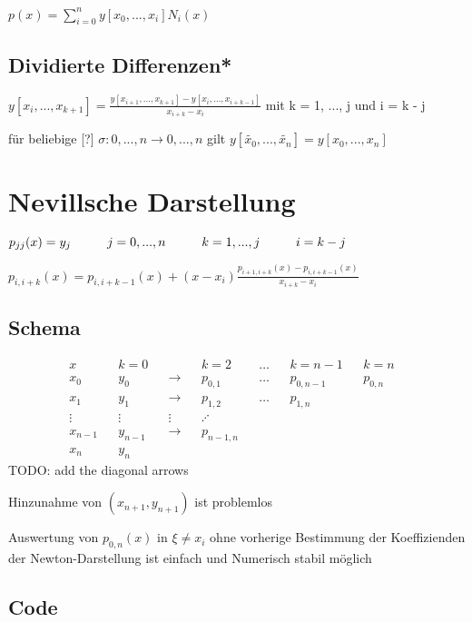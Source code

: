 \documentclass[12pt,a4paper]{article} %
\newcommand*\tab[1][1cm]{\hspace*{#1}}
\begin{document}
	$p(x) = \sum_{i = 0}^{n}y[x_0, ..., x_i] N_i(x)$
	
	\subsection{Dividierte Differenzen*}
	
	$y[x_i, ..., x_{k + 1}] = \frac{y[x_{i + 1}, ..., x_{k + 1}] - y[x_i, ..., x_{i + k - 1}]}{x_{i + k} - x_i}$ mit k = 1, ..., j und i = k - j
	
	für beliebige [?] $\sigma:{0, ..., n} \rightarrow {0, ..., n}$ gilt $y[\tilde{x_0}, ..., \tilde{x_n}] = y[x_0, ..., x_n]$
	
	\newpage
	
	\section{Nevillsche Darstellung}
	
	$p_{jj}(x) = y_j \tab j = 0, ..., n \tab k = 1, ..., j \tab i = k - j$
	
	$p_{i, i + k}(x) = p_{i, i + k - 1}(x) + (x - x_i)\frac{p_{i + 1, i + k}(x) - p_{i, i + k - 1}(x)}{x_{i + k} - x_i}$
	
	\subsection{Schema}
	
	\begin{align*}
		x && k = 0 && && k = 2 && {}\ldots{} && k = n - 1 && k = n & \\
		x_0 && y_0 && \longrightarrow && p_{0, 1} && {}\ldots{} && p_{0, n - 1} && p_{0, n} & \\
		x_1 && y_1 && \longrightarrow && p_{1, 2} && {}\ldots{} && p_{1, n} & \\
		\vdots && \vdots && \vdots && \iddots & \\
		x_{n - 1} && y_{n - 1} && \longrightarrow && p_{n - 1, n} & \\
		x_n && y_n
	\end{align*}
	TODO: add the diagonal arrows
	
	Hinzunahme von $(x_{n + 1}, y_{n + 1})$ ist problemlos
	
	Auswertung von $p_{0, n}(x)$ in $\xi \ne x_i$ ohne vorherige Bestimmung der Koeffizienden der Newton-Darstellung ist einfach und Numerisch stabil möglich
	
	\subsection{Code}
	
\end{document}
